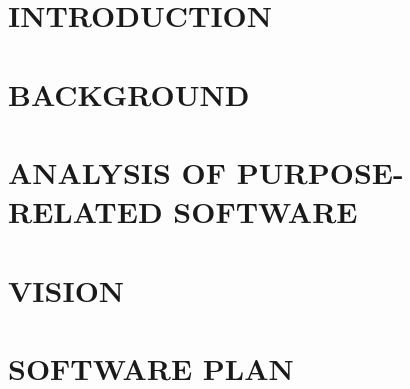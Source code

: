 

\usepackage{listings}
\usepackage{xcolor}
\usepackage{algorithm}
\usepackage{algorithmicx}
\usepackage{algpseudocode}






\lstset{style=sharpc}








\newpage
\tableofcontents
\newpage





\clearpage
\section{INTRODUCTION}


\clearpage
\section{BACKGROUND}


\clearpage
\section{ANALYSIS OF PURPOSE-RELATED SOFTWARE}\label{related}


\clearpage
\section{VISION}


\clearpage
\section{SOFTWARE PLAN}


